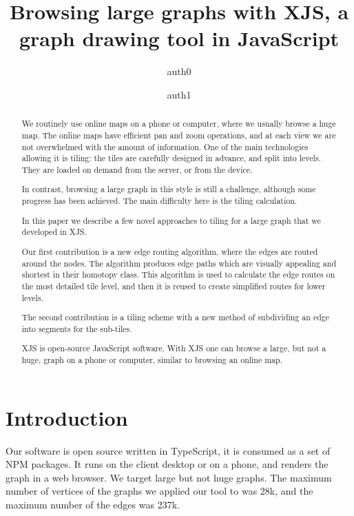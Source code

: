 \documentclass{gd-llncs}
\begin{document}
\title{Browsing large graphs with XJS, a graph drawing tool in JavaScript }
\author{%
  auth0  \and
  auth1
}%
\maketitle

\begin{abstract}
  We routinely use online maps on a phone or computer, where we usually browse a huge map. 
  The online maps have efficient pan and zoom operations, 
  and at each view we are not overwhelmed with the amount of information.
  One of the main technologies allowing it is tiling: the tiles are carefully designed in advance,
   and split into levels. They are loaded on demand from the server, or from the device.
  
  In contrast, browsing a large graph in this style is still a challenge, although some progress has been achieved.
  The main difficulty here is the tiling calculation.
   

  In this paper we describe a few novel approaches to tiling for a large graph that we developed in XJS.
  
  Our first contribution is a new edge routing algorithm, where the edges are routed around the nodes. 
  The algorithm produces edge paths which are visually appealing and shortest in their homotopy class.
  This algorithm is used to calculate the edge routes on the most detailed tile level, 
  and then it is reused to create simplified routes for lower levels.
  
   The second contribution is a tiling scheme with a new method of subdividing an 
   edge into segments for the sub-tiles.
   
   XJS is open-source JavaScript software. With XJS one can browse a large, but not a huge, 
   graph on a phone or computer, similar to browsing an online map.
  

  
\end{abstract}


\section{Introduction}

\label{sec:intro}
Our software is open source written in TypeScript, it is consumed as a set of NPM packages.
It runs on the client desktop or on a phone, and renders the graph in a web browser.
We target large but not huge graphs. The maximum number of vertices of the graphs we applied our tool to was 28k,
and the maximum number of the edges was 237k.
\end{document}
